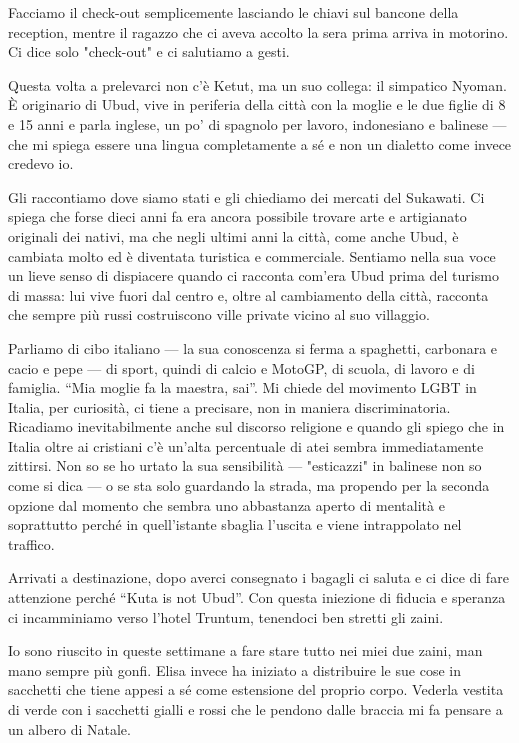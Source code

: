 Facciamo il check-out semplicemente lasciando le chiavi sul bancone della reception, mentre il ragazzo che ci aveva accolto la sera prima arriva in motorino. Ci dice solo "check-out" e ci salutiamo a gesti.

Questa volta a prelevarci non c'è Ketut, ma un suo collega: il simpatico Nyoman. È originario di Ubud, vive in periferia della città con la moglie e le due figlie di 8 e 15 anni e parla inglese, un po' di spagnolo per lavoro, indonesiano e balinese — che mi spiega essere una lingua completamente a sé e non un dialetto come invece credevo io.

Gli raccontiamo dove siamo stati e gli chiediamo dei mercati del Sukawati. Ci spiega che forse dieci anni fa era ancora possibile trovare arte e artigianato originali dei nativi, ma che negli ultimi anni la città, come anche Ubud, è cambiata molto ed è diventata turistica e commerciale. Sentiamo nella sua voce un lieve senso di dispiacere quando ci racconta com'era Ubud prima del turismo di massa: lui vive fuori dal centro e, oltre al cambiamento della città, racconta che sempre più russi costruiscono ville private vicino al suo villaggio.

Parliamo di cibo italiano — la sua conoscenza si ferma a spaghetti, carbonara e cacio e pepe — di sport, quindi di calcio e MotoGP, di scuola, di lavoro e di famiglia. “Mia moglie fa la maestra, sai”. Mi chiede del movimento LGBT in Italia, per curiosità, ci tiene a precisare, non in maniera discriminatoria. Ricadiamo inevitabilmente anche sul discorso religione e quando gli spiego che in Italia oltre ai cristiani c'è un'alta percentuale di atei sembra immediatamente zittirsi. Non so se ho urtato la sua sensibilità — "esticazzi" in balinese non so come si dica — o se sta solo guardando la strada, ma propendo per la seconda opzione dal momento che sembra uno abbastanza aperto di mentalità e soprattutto perché in quell'istante sbaglia l'uscita e viene intrappolato nel traffico.

Arrivati a destinazione, dopo averci consegnato i bagagli ci saluta e ci dice di fare attenzione perché “Kuta is not Ubud”. Con questa iniezione di fiducia e speranza ci incamminiamo verso l'hotel Truntum, tenendoci ben stretti gli zaini.

Io sono riuscito in queste settimane a fare stare tutto nei miei due zaini, man mano sempre più gonfi. Elisa invece ha iniziato a distribuire le sue cose in sacchetti che tiene appesi a sé come estensione del proprio corpo. Vederla vestita di verde con i sacchetti gialli e rossi che le pendono dalle braccia mi fa pensare a un albero di Natale.

